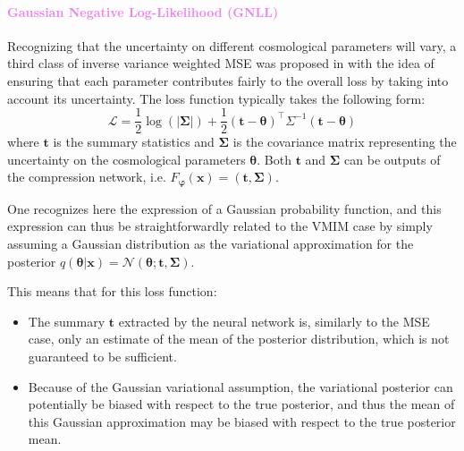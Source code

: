\documentclass{aa}
\begin{document}
\paragraph{\textcolor{violet}{Gaussian Negative Log-Likelihood (GNLL)}}
Recognizing that the uncertainty on different cosmological parameters will vary, a third
class of inverse variance weighted MSE was proposed in \cite{fluri2018cosmological} with the idea of
ensuring that each parameter contributes fairly to the overall loss by taking into account its uncertainty. The loss function typically takes the following form:
\begin{equation}
    \mathcal{L} = \frac{1}{2} \log(|\bm{\Sigma}|) + \frac{1}{2}(\bm{t} - \bm{\theta})^{\top} \Sigma^{-1} (\bm{t} - \bm{\theta}) 
\end{equation}
where $\bm{t}$ is the summary statistics and $\bm{\Sigma}$ is the covariance matrix representing the uncertainty on the cosmological parameters $\bm{\theta}$. Both $\bm{t}$ and $\bm{\Sigma}$ can be outputs of the compression network, i.e. $F_{\bm{\varphi}}(\bm{x})=(\bm{t}, \bm{\Sigma})$.

One recognizes here the expression of a Gaussian probability function, and this expression can thus be straightforwardly related to the VMIM case by simply assuming a Gaussian distribution as the variational approximation for the posterior $q(\bm{\theta} | \bm{x}) = \mathcal{N}(\bm{\theta}; \bm{t}, \bm{\Sigma})$.

This means that for this loss function:
\begin{itemize}
    \item The summary $\bm{t}$ extracted by the neural network is, similarly to the MSE case, only an estimate of the mean of 
    the posterior distribution, which is not guaranteed to be sufficient.
    \item Because of the Gaussian variational assumption, the variational posterior can potentially be biased with respect to the true posterior, and thus the mean of this Gaussian approximation may be biased with respect to the true posterior mean.
\end{itemize}
\end{document}
